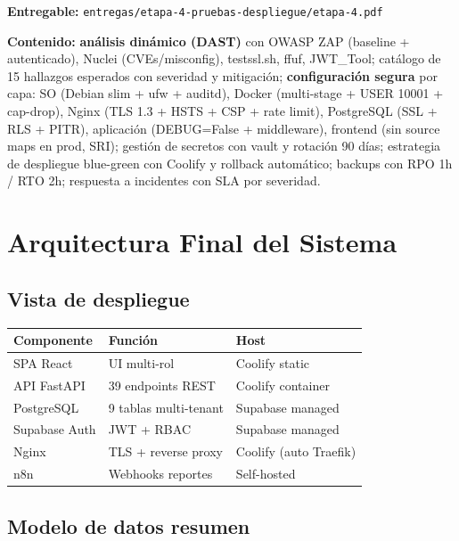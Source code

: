 \documentclass[12pt,a4paper,oneside]{article}
\begin{document}
\textbf{Entregable:} \texttt{entregas/etapa-4-pruebas-despliegue/etapa-4.pdf}

\textbf{Contenido:} \textbf{análisis dinámico (DAST)} con OWASP ZAP (baseline + autenticado), Nuclei (CVEs/misconfig), testssl.sh, ffuf, JWT\_Tool; catálogo de 15 hallazgos esperados con severidad y mitigación; \textbf{configuración segura} por capa: SO (Debian slim + ufw + auditd), Docker (multi-stage + USER 10001 + cap-drop), Nginx (TLS 1.3 + HSTS + CSP + rate limit), PostgreSQL (SSL + RLS + PITR), aplicación (DEBUG=False + middleware), frontend (sin source maps en prod, SRI); gestión de secretos con vault y rotación 90 días; estrategia de despliegue blue-green con Coolify y rollback automático; backups con RPO 1h / RTO 2h; respuesta a incidentes con SLA por severidad.

\section{Arquitectura Final del Sistema}

\subsection{Vista de despliegue}

\begin{center}
\begin{tabular}{|p{3cm}|p{5cm}|p{4cm}|}
\hline
\rowcolor{accent!20}
\textbf{Componente} & \textbf{Función} & \textbf{Host} \\
\hline
SPA React & UI multi-rol & Coolify static \\
\hline
API FastAPI & 39 endpoints REST & Coolify container \\
\hline
PostgreSQL & 9 tablas multi-tenant & Supabase managed \\
\hline
Supabase Auth & JWT + RBAC & Supabase managed \\
\hline
Nginx & TLS + reverse proxy & Coolify (auto Traefik) \\
\hline
n8n & Webhooks reportes & Self-hosted \\
\hline
\end{tabular}
\end{center}

\subsection{Modelo de datos resumen}
\end{document}
